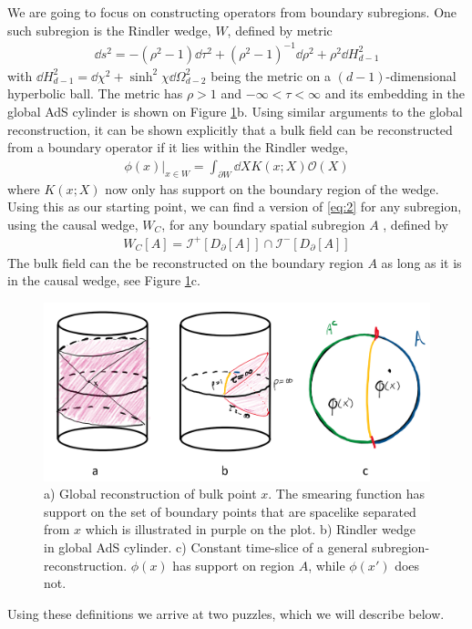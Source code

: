 \documentclass[letter,12pt]{article}
\newcommand{\BO}{\mathcal{O}}
\begin{document}
We are going to focus on constructing operators from boundary subregions. One such subregion is the Rindler wedge, $W$, defined by metric
\begin{equation}
	\begin{aligned}
		\dd s^2=-(\rho^2-1)\dd \tau^2+(\rho^2-1)^{-1}\dd \rho^2+\rho^2\dd H_{d-1}^2
	\end{aligned}
\end{equation}
with $\dd H^2_{d-1}=\dd \chi^2+\sinh^2\chi\dd \Omega_{d-2}^2$ being the metric on a $(d-1)$-dimensional hyperbolic ball. The metric has $\rho>1$ and $-\infty <\tau < \infty$ and its embedding in the global AdS cylinder is shown on Figure \ref{fig:adscftfig2}b. Using similar arguments to the global reconstruction, it can be shown explicitly that a bulk field can be reconstructed from a boundary operator if it lies within the Rindler wedge,
\begin{equation}
	\begin{aligned}
		\phi(x)|_{x\in W}=\int_{\partial W}\dd X K(x;X)\BO(X)
	\end{aligned}
\end{equation}
where $K(x;X)$ now only has support on the boundary region of the wedge. Using this as our starting point, we can find a version of \eqref{eq:2} for any subregion, using the causal wedge, $W_C$, for any boundary spatial subregion $A$ , defined by 
\begin{equation}
	\begin{aligned}
		W_C[A]=\mathscr{I}^+[D_\partial[A]]\cap\mathscr{I}^-[D_\partial[A]]
	\end{aligned}
\end{equation}
The bulk field can the be reconstructed on the boundary region $A$ as long as it is in the causal wedge, see Figure \ref{fig:adscftfig2}c. 
\begin{figure}[]
	\centering
	\includegraphics[width=0.95\linewidth]{ADS_CFT_Fig2}
	\caption{a) Global reconstruction of bulk point $x$. The smearing function has support on the set of boundary points that are spacelike separated from $x$ which is illustrated in purple on the plot. b) Rindler wedge in global AdS cylinder. c) Constant time-slice  of a general subregion-reconstruction. $\phi(x)$ has support on region $A$, while $\phi(x')$ does not.}
	\label{fig:adscftfig2}
\end{figure}
Using these definitions we arrive at two puzzles, which we will describe below.
\end{document}
